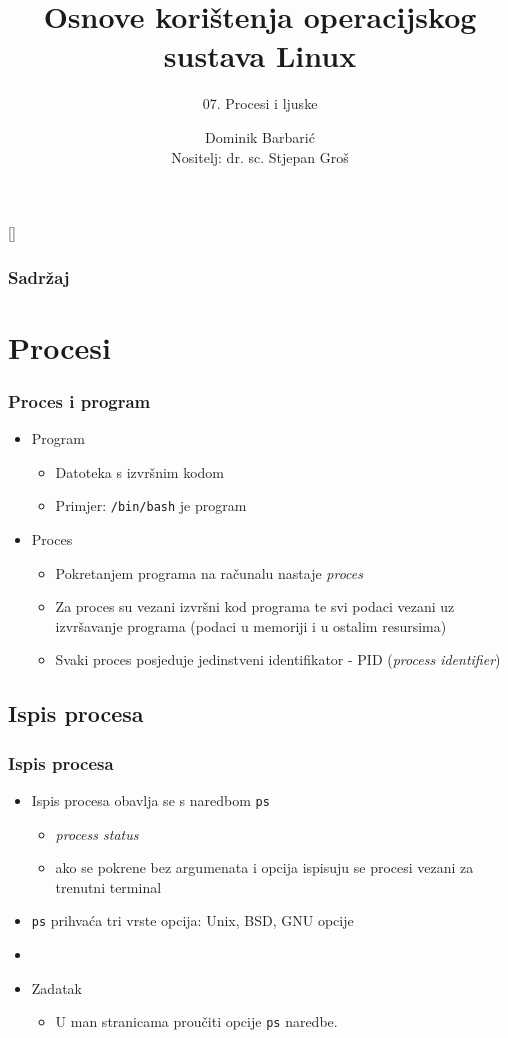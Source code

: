\documentclass[table,usenames,dvipsnames]{beamer}
\title{Osnove korištenja operacijskog sustava Linux}
\subtitle{07. Procesi i ljuske}
\author[Dominik Barbarić]{Dominik Barbarić\\ \small{Nositelj: dr. sc. Stjepan Groš}}
\institute[FER]{Sveučilište u Zagrebu \\
				Fakultet elektrotehnike i računarstva}
\date{\todayiso}
\newcommand{\shell}[1]{\texttt{#1}}
\begin{document}
{
[] %

\begin{frame}
\maketitle
\end{frame}
}

\begin{frame}
\frametitle{Sadržaj}
\tableofcontents
\end{frame}

\section{Procesi}
\begin{frame}[t]
\frametitle{Proces i program}
\begin{itemize}
  \item Program
  \begin{itemize}
    \item Datoteka s izvršnim kodom
    \item Primjer: \shell{/bin/bash} je program
  \end{itemize}
  \item Proces
  \begin{itemize}
    \item Pokretanjem programa na računalu nastaje \emph{proces}
    \item Za proces su vezani izvršni kod programa te svi podaci vezani uz izvršavanje programa (podaci u memoriji i u ostalim resursima)
    \item Svaki proces posjeduje jedinstveni identifikator - PID (\emph{process identifier})
  \end{itemize}
\end{itemize}
\end{frame}

\subsection{Ispis procesa}
\begin{frame}[t]
\frametitle{Ispis procesa}
\begin{itemize}
 
  \item Ispis procesa obavlja se s naredbom \shell{ps} 
  \begin{itemize}
  	\item \emph{process status}
  	\item ako se pokrene bez argumenata i opcija ispisuju se procesi vezani za trenutni terminal
  \end{itemize}
  \item \shell{ps} prihvaća tri vrste opcija: Unix, BSD, GNU opcije
  \item[]
	\item Zadatak
	\begin{itemize}
	  	\item U man stranicama proučiti opcije \shell{ps} naredbe.
  	\end{itemize}
\end{itemize}
\end{frame}
\end{document}
